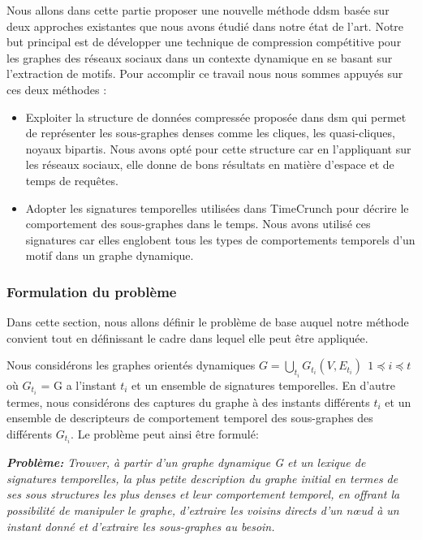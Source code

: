Nous allons dans cette partie proposer une nouvelle méthode \gls{ddsm} basée sur deux approches existantes que nous avons étudié dans notre état de l'art. Notre but principal est de développer une technique de compression compétitive pour les graphes des réseaux sociaux dans un contexte dynamique en se basant sur l'extraction de motifs. Pour accomplir ce travail nous nous sommes appuyés sur ces deux méthodes :
\begin{itemize}
\item Exploiter la structure de données compressée proposée dans \gls{dsm} \citep{hernandez2014compressed} qui permet de représenter les sous-graphes denses comme les cliques, les quasi-cliques, noyaux bipartis. Nous avons opté pour cette structure car en l'appliquant sur les réseaux sociaux, elle donne de bons résultats en matière d'espace et de temps de requêtes.  
\item Adopter les signatures temporelles utilisées dans TimeCrunch \citep{shah2015timecrunch} pour décrire le comportement des sous-graphes dans le temps. Nous avons utilisé ces signatures car elles englobent tous les types de comportements temporels d'un motif dans un graphe dynamique.
\end{itemize}	
		
		\subsubsection{Formulation du problème}
		Dans cette section, nous allons définir le problème de base auquel notre méthode convient tout en définissant le cadre dans lequel elle peut être appliquée. 
		
		Nous considérons les graphes orientés dynamiques $\displaystyle{G=\bigcup_{t_{i}}G_{t_{i}}(V,E_{t_{i}})}\ \ 1 \preceq i \preceq t$ où $G_{t_{i}}$ = G a l'instant $t_{i}$ et un ensemble de signatures temporelles. En d'autre termes, nous considérons des captures du graphe à des instants différents $t_{i}$ et un ensemble de descripteurs de comportement temporel des sous-graphes des différents $G_{t_{i}}$. Le problème peut ainsi être formulé:
		
			\textit{\textbf{Problème:}
		Trouver, à partir d'un graphe dynamique G et un lexique de signatures temporelles, la plus petite description du graphe initial en termes de ses sous structures les plus denses et leur comportement temporel, en offrant la possibilité de manipuler le graphe, d'extraire les voisins directs d'un nœud à un instant donné et d'extraire les sous-graphes au besoin. }

